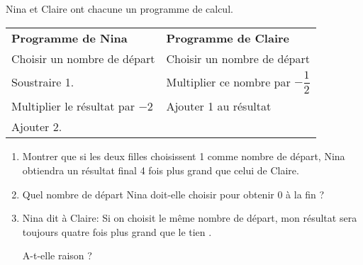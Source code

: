 
\medskip

Nina et Claire ont chacune un programme de calcul.

\begin{center}
\begin{tabularx}{\linewidth}{|X|X|}\hline
\textbf{Programme de Nina}&\textbf{Programme de Claire}\\
Choisir un nombre de départ&Choisir un nombre de départ\\
Soustraire 1.&Multiplier ce nombre par $- \dfrac{1}{2}$\\
Multiplier le résultat par $-2$&Ajouter 1 au résultat\\
Ajouter 2.&\\ \hline
\end{tabularx}
\end{center}
\smallskip

\begin{enumerate}
\item Montrer que si les deux filles choisissent 1 comme nombre de départ, Nina
obtiendra un résultat final 4 fois plus grand que celui de Claire.
\item  Quel nombre de départ Nina doit-elle choisir pour obtenir $0$ à la fin ?
\item  Nina dit à Claire: \og Si on choisit le même nombre de départ, mon résultat sera
toujours quatre fois plus grand que le tien \fg.

A-t-elle raison ?
\end{enumerate}

\bigskip

